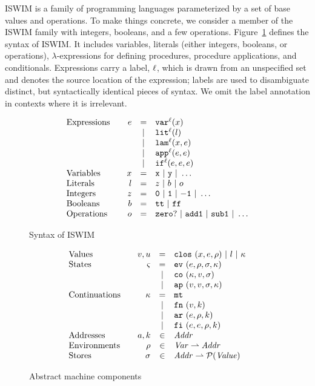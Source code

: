 \documentclass[preprint,onecolumn,9pt]{sigplanconf} %
\begin{document}
ISWIM is a family of programming languages parameterized by a set of
base values and operations.  To make things concrete, we consider a
member of the ISWIM family with integers, booleans, and a few
operations.
%
Figure~\ref{fig:syntax} defines the syntax of ISWIM.  It
includes variables, literals (either integers, booleans, or
operations), $\lambda$-expressions for defining procedures, procedure
applications, and conditionals.  Expressions carry a label, ${\ell}$,
which is drawn from an unspecified set and denotes the source location
of the expression; labels are used to disambiguate distinct, but
syntactically identical pieces of syntax.  We omit the label
annotation in contexts where it is irrelevant.

\begin{figure}
\small
\[
\begin{array}{l@{\qquad}rcl}
\text{Expressions} & \mexp &=& \svar[^\mlab]\mvar\\
&&|& \slit[^\mlab]\mlit\\
&&|& \slam[^\mlab]\mvar\mexp\\
&&|& \sapp[^\mlab]\mexp\mexp \\
&&|& \sif[^\mlab]\mexp\mexp\mexp \\
\text{Variables}&\mvar &=& \syntax{x}\ |\ \syntax{y}\ |\ \dots\\
\text{Literals}&\mlit &=& \mnum\ |\ \mbln\ |\ \mop\\
\text{Integers}&\mnum &=& \syntax{0}\ |\ \syntax{1}\ |\ \syntax{-1}\ |\ \dots\\
\text{Booleans}&\mbln &=& \strue\ |\ \sfalse\\
\text{Operations}&\mop &=& \syntax{zero?}\ |\ \syntax{add1}\ |\ \syntax{sub1}\ |\ \dots
\end{array}
\]
\caption{Syntax of ISWIM}
\label{fig:syntax}
\end{figure}

\begin{figure}
\small
\[
\begin{array}{l@{\qquad}rcl}
\text{Values} & \mval,\mvalx{u} &=& \clos{\mvar,\mexp,\menv}\ |\ \mlit\ |\ \mkont\\
\text{States} & \mstate &=& \ev{\mexp,\menv,\msto,\mkont}\\
                       &&|& \co{\mkont,\mval,\msto}\\
                       &&|& \ap{\mval,\mval,\msto,\mkont}\\
\text{Continuations} & \mkont &=& \kmt\\
&&|& \kfn{\mval,\mkaddr}\\
&&|& \kar{\mexp,\menv,\mkaddr}\\
&&|& \kif{\mexp,\mexp,\menv,\mkaddr}\\
\text{Addresses} &\maddr,\mkaddr&\in&\Addr \\
\text{Environments} &\menv&\in& \Var \rightharpoonup \Addr\\
\text{Stores} &\msto&\in& \Addr \rightharpoonup \mathcal{P}(\Value)
\end{array}
\]
\caption{Abstract machine components}
\label{fig:domains}
\end{figure}
\end{document}

